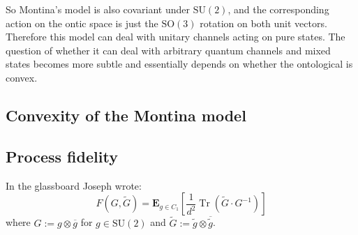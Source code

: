 \documentclass[12pt,draft]{article}
\DeclareMathOperator{\Tr}{Tr}
\theoremstyle{definition}
\theoremstyle{plain}
\begin{document}
    So Montina's model is also covariant under
    $\text{SU}(2)$, and the corresponding action on the
    ontic space is just the $\text{SO}(3)$ rotation on both
    unit vectors. Therefore this model can deal with unitary
    channels acting on pure states. The question of whether
    it can deal with arbitrary quantum channels and mixed
    states becomes more subtle and essentially depends on
    whether the ontological is convex.

    \subsection{Convexity of the Montina model}

    \subsection{Process fidelity}

    In the glassboard Joseph wrote:
    \begin{equation}
        F(G, \tilde G)
        = \mathbf{E}_{g \in C_1}\left[
        \frac{1}{d^2} \Tr\left( \tilde G \cdot G^{-1}
        \right) \right]
    \end{equation}
    where $G := g \otimes \overline{g}$ for $g \in
    \text{SU}(2)$ and $\tilde G := \tilde g \otimes
    \overline{\tilde g}$.
\end{document}
